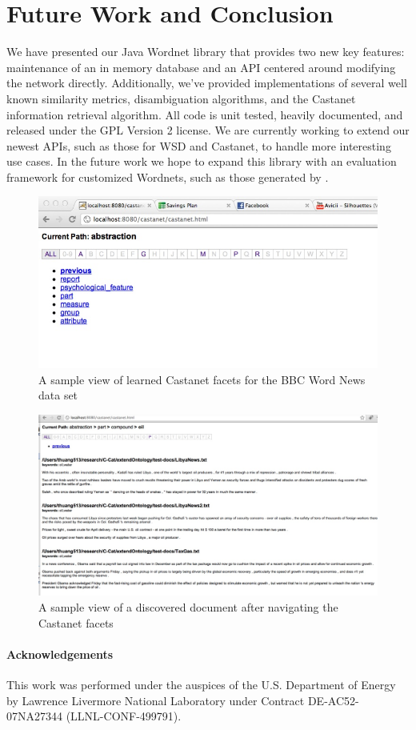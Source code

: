 \documentclass[a4paper,11pt]{article}
\begin{document}
\section{Future Work and Conclusion}

We have presented our Java Wordnet library that provides two new key features: maintenance of an in memory database and an API centered around modifying the network directly.  Additionally, we've provided implementations of several well known similarity metrics, disambiguation algorithms, and the Castanet information retrieval algorithm.  All code is unit tested, heavily documented, and released under the GPL Version 2 license.  We are currently working to extend our newest APIs, such as those for WSD and Castanet, to handle more interesting use cases.  In the future work we hope to expand this library with an evaluation framework for customized Wordnets, such as those generated by \cite{snow06extwn}.

\begin{figure}[h!]
\includegraphics[width=1.0\textwidth]{new_castanet3.jpg}
\caption{A sample view of learned Castanet facets for the BBC Word News data set}
\label{fig:casta1}
\end{figure}

\begin{figure}[h!]
\includegraphics[width=1.0\textwidth]{new_castanet4.jpg}
\caption{A sample view of a discovered document after navigating the Castanet facets}
\label{fig:casta2}
\end{figure}

\paragraph{Acknowledgements} This work was performed under the auspices of the U.S. Department of Energy by Lawrence Livermore National Laboratory under Contract DE-AC52-07NA27344 (LLNL-CONF-499791).



\end{document}
